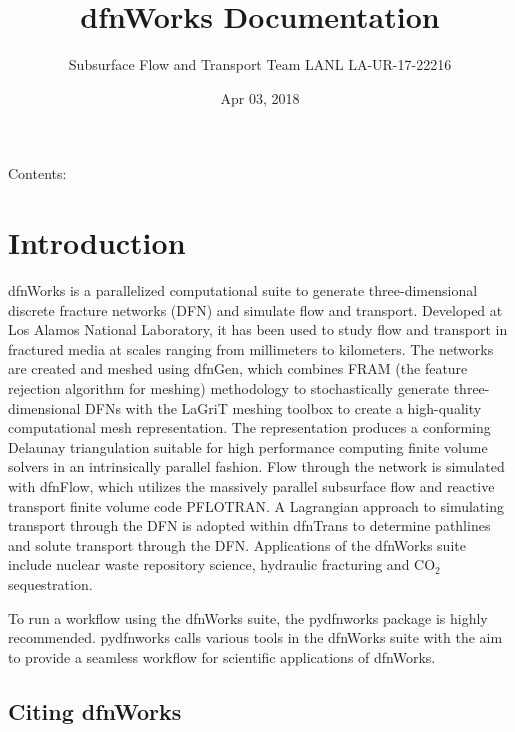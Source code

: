 \documentclass[letterpaper,10pt,english]{sphinxmanual}
\title{dfnWorks Documentation}
\date{Apr 03, 2018}
\author{Subsurface Flow and Transport Team 
 LANL 
 LA-UR-17-22216}
\begin{document}
\maketitle
\sphinxtableofcontents
{}\label{\detokenize{index::doc}}


Contents:


\chapter{Introduction}
\label{\detokenize{intro:introduction}}\label{\detokenize{intro::doc}}\label{\detokenize{intro:welcome-to-dfnworks-2-1-documentation}}
dfnWorks is a parallelized computational suite to generate three-dimensional
discrete fracture networks (DFN) and simulate flow and transport. Developed at
Los Alamos National Laboratory, it has been used to study flow and transport
in fractured media at scales ranging from millimeters to kilometers. The
networks are created and meshed using dfnGen, which combines FRAM (the feature
rejection algorithm for meshing) methodology to stochastically generate
three-dimensional DFNs with the LaGriT meshing toolbox to create a high-quality
computational mesh representation. The representation produces a conforming
Delaunay triangulation suitable for high performance computing finite volume
solvers in an intrinsically parallel fashion. Flow through the network is
simulated with dfnFlow, which utilizes the massively parallel subsurface flow
and reactive transport finite volume code PFLOTRAN. A Lagrangian approach to
simulating transport through the DFN is adopted within dfnTrans to determine
pathlines and solute transport through the DFN. Applications of the dfnWorks
suite include nuclear waste repository science, hydraulic fracturing and
CO$_{\text{2}}$ sequestration.

To run a workflow using the dfnWorks suite, the pydfnworks package is
highly recommended. pydfnworks calls various tools in the dfnWorks suite with
the aim to provide a seamless workflow for scientific applications of dfnWorks.


\section{Citing dfnWorks}
\label{\detokenize{intro:citing-dfnworks}}
\end{document}
